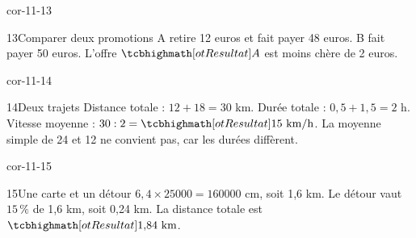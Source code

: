 \begin{blocLivre}{cor-11-13}\begin{corrige}{13}{Comparer deux promotions}
A retire 12 euros et fait payer 48 euros. B fait payer 50 euros. L’offre $\res A$ est moins chère de 2 euros.
\end{corrige}\end{blocLivre}
\begin{blocLivre}{cor-11-14}\begin{corrige}{14}{Deux trajets}
Distance totale : $12+18=30$ km. Durée totale : $0{,}5+1{,}5=2$ h. Vitesse moyenne : $30:2=\res{15\ \mathrm{km/h}}$. La moyenne simple de 24 et 12 ne convient pas, car les durées diffèrent.
\end{corrige}\end{blocLivre}
\begin{blocLivre}{cor-11-15}\begin{corrige}{15}{Une carte et un détour}
$6{,}4\times25000=160000$ cm, soit 1,6 km. Le détour vaut $15\,\%$ de 1,6 km, soit 0,24 km. La distance totale est $\res{1{,}84\ \mathrm{km}}$.
\label{fig-cor-11-15}
\end{corrige}\end{blocLivre}

